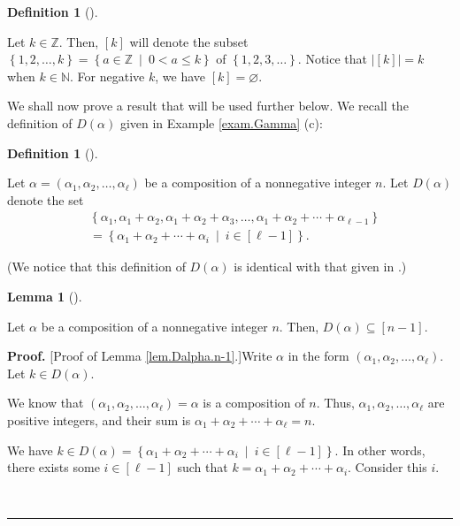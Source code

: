 \documentclass[numbers=enddot,12pt,final,onecolumn,notitlepage,abstracton]{scrartcl}
\theoremstyle{definition}
\newtheorem{lem}[theo]{Lemma}
\newenvironment{lemma}[1][]
{\begin{lem}[#1]\begin{leftbar}}
{\end{leftbar}\end{lem}}
\newtheorem{defi}[theo]{Definition}
\newenvironment{definition}[1][]
{\begin{defi}[#1]\begin{leftbar}}
{\end{leftbar}\end{defi}}
\newenvironment{proof}[1][Proof]{\noindent\textbf{#1.} }{\ \rule{0.5em}{0.5em}}
\newenvironment{verlong}{}{}
\begin{document}
\begin{verlong}
\begin{footnotesize}
\begin{definition}
\label{def.k}Let $k\in\mathbb{Z}$. Then, $\left[  k\right]  $ will denote the
subset $\left\{  1,2,\ldots,k\right\}  =\left\{  a\in\mathbb{Z}\ \mid\ 0<a\leq
k\right\}  $ of $\left\{  1,2,3,\ldots\right\}  $. Notice that $\left\vert
\left[  k\right]  \right\vert =k$ when $k\in\mathbb{N}$. For negative $k$, we
have $\left[  k\right]  =\varnothing$.
\end{definition}

We shall now prove a result that will be used further below. We recall the
definition of $D\left(  \alpha\right)  $ given in Example \ref{exam.Gamma} (c):

\begin{definition}
\label{def.Dalpha}Let $\alpha=\left(  \alpha_{1},\alpha_{2},\ldots
,\alpha_{\ell}\right)  $ be a composition of a nonnegative integer $n$. Let
$D\left(  \alpha\right)  $ denote the set
\begin{align*}
&  \left\{  \alpha_{1},\alpha_{1}+\alpha_{2},\alpha_{1}+\alpha_{2}+\alpha
_{3},\ldots,\alpha_{1}+\alpha_{2}+\cdots+\alpha_{\ell-1}\right\} \\
&  =\left\{  \alpha_{1}+\alpha_{2}+\cdots+\alpha_{i}\ \mid\ i\in\left[
\ell-1\right]  \right\}  .
\end{align*}

\end{definition}

(We notice that this definition of $D\left(  \alpha\right)  $ is identical
with that given in \cite[Definition 5.1.10]{Reiner}.)

\begin{lemma}
\label{lem.Dalpha.n-1}Let $\alpha$ be a composition of a nonnegative integer
$n$. Then, $D\left(  \alpha\right)  \subseteq\left[  n-1\right]  $.
\end{lemma}

\begin{proof}
[Proof of Lemma \ref{lem.Dalpha.n-1}.]Write $\alpha$ in the form $\left(
\alpha_{1},\alpha_{2},\ldots,\alpha_{\ell}\right)  $. Let $k\in D\left(
\alpha\right)  $.

We know that $\left(  \alpha_{1},\alpha_{2},\ldots,\alpha_{\ell}\right)
=\alpha$ is a composition of $n$. Thus, $\alpha_{1},\alpha_{2},\ldots
,\alpha_{\ell}$ are positive integers, and their sum is $\alpha_{1}+\alpha
_{2}+\cdots+\alpha_{\ell}=n$.

We have $k\in D\left(  \alpha\right)  =\left\{  \alpha_{1}+\alpha_{2}%
+\cdots+\alpha_{i}\ \mid\ i\in\left[  \ell-1\right]  \right\}  $. In other
words, there exists some $i\in\left[  \ell-1\right]  $ such that $k=\alpha
_{1}+\alpha_{2}+\cdots+\alpha_{i}$. Consider this $i$.


\end{proof}
\end{footnotesize}
\end{verlong}
\end{document}
